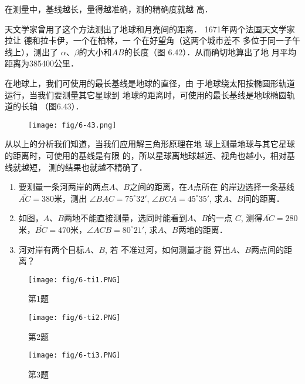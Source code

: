 在测量中，基线越长，量得越准确，测的精确度就越
高．

天文学家曾用了这个方法测出了地球和月亮间的距离．
1671年两个法国天文学家拉让
德和拉卡伊，一个在柏林，一
个在好望角（这两个城市差不
多位于同一子午线上），测出了
$\alpha$、$\beta$的大小和$AB$的长度（图
6.42）．从而确切地算出了地
月平均距离为385400公里．

在地球上，我们可使用的最长基线是地球的直径，由
于地球绕太阳按椭圆形轨道运行，当我们要测量其它星球到
地球的距离时，可使用的最长基线是地球椭圆轨道的长轴
（图6.43）．

\begin{figure}[htp]
    \centering
\texttt{[image: fig/6-43.png]}
    \caption{}
\end{figure}

从以上的分析我们知道，当我们应用解三角形原理在地
球上测量地球与其它星球的距离时，可使用的基线是有限
的，所以星球离地球越远、视角也越小，相对基线就越短，
测的结果也就越不精确了．

\begin{ex}
\begin{enumerate}
    \item 要测量一条河两岸的两点$A$、$B$之间的距离，在$A$点所在
    的岸边选择一条基线$\overline{AC}=380$米，测出
    $\angle BAC=75^{\circ}32'$, $\angle BCA=45^{\circ}35'$, 
    求$A$、$B$间的距离．
    \item 如图，$A$、$B$两地不能直接测量，选同时能看到$A$、$B$的一点
    $C$, 测得$\overline{AC}=280$米，$\overline{BC}=470$米，$\angle ACB=80^{\circ}21'$, 
    求$A$、$B$两地的距离．
    \item 河对岸有两个目标$A$、$B$, 若
    不准过河，如何测量才能
    算出$A$、$B$两点间的距离？
\end{enumerate}
\end{ex}

\begin{figure}[htp]\centering
    \begin{minipage}[t]{0.48\textwidth}
    \centering
    \texttt{[image: fig/6-ti1.PNG]}
    \caption*{第1题}
    \end{minipage}
    \begin{minipage}[t]{0.48\textwidth}
    \centering
    \texttt{[image: fig/6-ti2.PNG]}
    \caption*{第2题}
    \end{minipage}
    \end{figure}

    \begin{figure}[htp]
        \centering
    \texttt{[image: fig/6-ti3.PNG]}
        \caption*{第3题}
    \end{figure}

